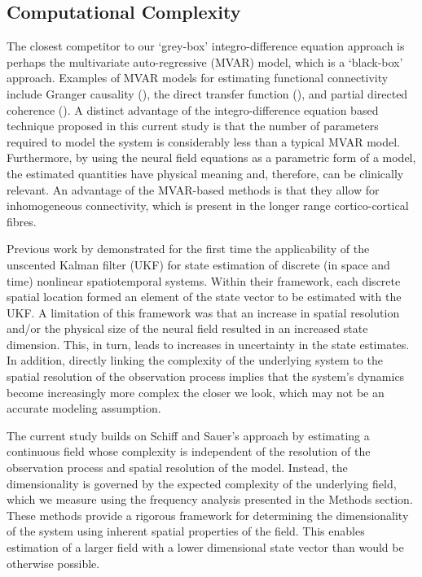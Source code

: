 \documentclass[5p,authoryear]{elsarticle}
\begin{document}
\subsection{Computational Complexity}
The closest competitor to our `grey-box' integro-difference equation approach is perhaps the multivariate auto-regressive (MVAR) model, which is a `black-box' approach. Examples of MVAR models for estimating functional connectivity include Granger causality (\cite{Hesse2003}), the direct transfer function (\cite{Kaminski1991}), and partial directed coherence (\cite{Sameshima1999}). A distinct advantage of the integro-difference equation based technique proposed in this current study is that the number of parameters required to model the system is considerably less than a typical MVAR model. Furthermore, by using the neural field equations as a parametric form of a model, the estimated quantities have physical meaning and, therefore, can be clinically relevant. An advantage of the MVAR-based methods is that they allow for inhomogeneous connectivity, which is present in the longer range cortico-cortical fibres. 

Previous work by \cite{schiff2008kalman} demonstrated for the first time the applicability of the unscented Kalman filter (UKF) for state estimation of discrete (in space and time) nonlinear spatiotemporal systems. Within their framework, each discrete spatial location formed an element of the state vector to be estimated with the UKF. A limitation of this framework was that an increase in spatial resolution and/or the physical size of the neural field resulted in an increased state dimension. This, in turn, leads to increases in uncertainty in the state estimates. In addition, directly linking the complexity of the underlying system to the spatial resolution of the observation process implies that the system's dynamics become increasingly more complex the closer we look, which may not be an accurate modeling assumption.

The current study builds on Schiff and Sauer's approach by estimating a continuous field whose complexity is independent of the resolution of the observation process and spatial resolution of the model. Instead, the dimensionality is governed by the expected complexity of the underlying field, which we measure using the frequency analysis presented in the Methods section. These methods provide a rigorous framework for determining the dimensionality of the system using inherent spatial properties of the field. This enables estimation of a larger field with a lower dimensional state vector than would be otherwise possible. 
\end{document}
